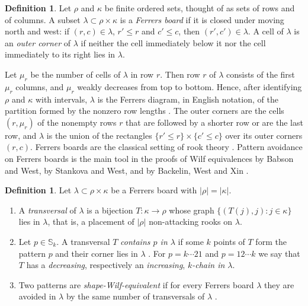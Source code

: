 \documentclass[11pt]{amsart}
\theoremstyle{definition}
\newtheorem{definition}[theorem]{Definition}
\theoremstyle{remark}
\newcommand{\bS}{\mathbb{S}}
\begin{document}
\begin{definition}\label{def:ferrers}
Let $\rho$ and $\kappa$ be finite ordered sets, thought of as sets of rows and of columns. A subset $\lambda\subset\rho\times\kappa$ is a \emph{Ferrers board} if it is closed under moving north and west: if $(r,c)\in\lambda$, $r'\le r$ and $c'\le c$, then $(r',c')\in\lambda$. A cell of $\lambda$ is an \emph{outer corner} of $\lambda$ if neither the cell immediately below it nor the cell immediately to its right lies in $\lambda$.
\end{definition}

Let $\mu_r$ be the number of cells of $\lambda$ in row $r$. Then row $r$ of $\lambda$ consists of the first $\mu_r$ columns, and $\mu_r$ weakly decreases from top to bottom. Hence, after identifying $\rho$ and $\kappa$ with intervals, $\lambda$ is the Ferrers diagram, in English notation, of the partition formed by the nonzero row lengths \cite{Stanley}. The outer corners are the cells $(r,\mu_r)$ of the nonempty rows $r$ that are followed by a shorter row or are the last row, and $\lambda$ is the union of the rectangles $\{r'\le r\}\times\{c'\le c\}$ over its outer corners $(r,c)$. Ferrers boards are the classical setting of rook theory \cite{GJW}. Pattern avoidance on Ferrers boards is the main tool in the proofs of Wilf equivalences by Babson and West, by Stankova and West, and by Backelin, West and Xin \cite{BW,SW,BWX}.

\begin{definition}\label{def:transversal}
Let $\lambda\subset\rho\times\kappa$ be a Ferrers board with $|\rho|=|\kappa|$.
\begin{enumerate}
\item A \emph{transversal} of $\lambda$ is a bijection $T\colon\kappa\to\rho$ whose graph $\{(T(j),j):j\in\kappa\}$ lies in $\lambda$, that is, a placement of $|\rho|$ non-attacking rooks on $\lambda$.
\item Let $p\in\bS_k$. A transversal $T$ \emph{contains $p$ in $\lambda$} if some $k$ points of $T$ form the pattern $p$ and their corner lies in $\lambda$ \cite{BWX}. For $p=k\cdots21$ and $p=12\cdots k$ we say that $T$ has a \emph{decreasing}, respectively an \emph{increasing}, \emph{$k$-chain in $\lambda$}.
\item Two patterns are \emph{shape-Wilf-equivalent} if for every Ferrers board $\lambda$ they are avoided in $\lambda$ by the same number of transversals of $\lambda$ \cite{BW,BWX}.
\end{enumerate}
\end{definition}
\end{document}
